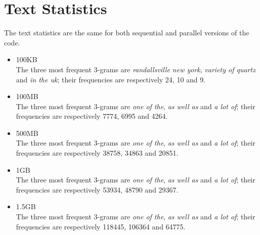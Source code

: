 \section{Text Statistics}
The text statistics are the same for both sequential and parallel versions of the code.
\begin{itemize}
    \item 100KB \\
        The three most frequent 3-grams are \textit{randallsville new york}, \textit{variety of quartz} and \textit{in the uk}; their frequencies are respectively 24, 10 and 9.
    \item 100MB \\
        The three most frequent 3-grams are \textit{one of the}, \textit{as well as} and \textit{a lot of}; their frequencies are respectively 7774, 6995 and 4264.
    \item 500MB \\
        The three most frequent 3-grams are \textit{one of the}, \textit{as well as} and \textit{a lot of}; their frequencies are respectively 38758, 34863 and 20851.
    \item 1GB \\
        The three most frequent 3-grams are \textit{one of the}, \textit{as well as} and \textit{a lot of}; their frequencies are respectively 53934, 48790 and 29367.
    \item 1.5GB \\
        The three most frequent 3-grams are \textit{one of the}, \textit{as well as} and \textit{a lot of}; their frequencies are respectively 118445, 106364 and 64775.
\end{itemize}

